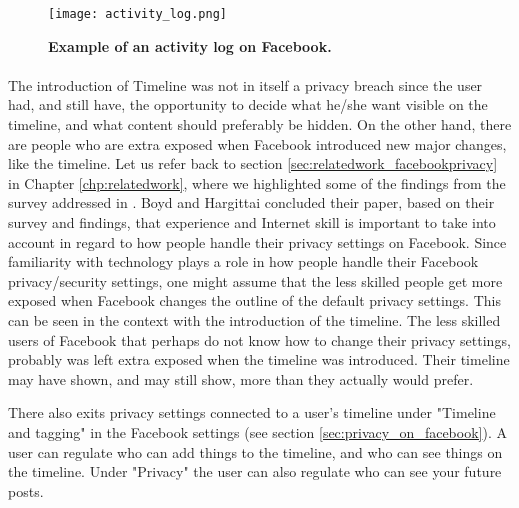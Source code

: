 \begin{figure}[t]
\centering
\texttt{[image: activity\_log.png]}
\caption [Example of an activity log on Facebook.]{\textbf{Example of an activity log on Facebook.}} 
\label{fig:activitylog}
\end{figure}

\paragraph{}
The introduction of Timeline was not in itself a privacy breach since the user had, and still have, the opportunity to decide what he/she want visible on the timeline, and what content should preferably be hidden. On the other hand, there are people who are extra exposed when Facebook introduced new major changes, like the timeline. Let us refer back to section \ref{sec:relatedwork_facebookprivacy} in Chapter \ref{chp:relatedwork}, where we highlighted some of the findings from the survey addressed in \cite{whocares}. Boyd and Hargittai concluded their paper, based on their survey and findings, that experience and Internet skill is important to take into account in regard to how people handle their privacy settings on Facebook. Since familiarity with technology plays a role in how people handle their Facebook privacy/security settings, one might assume that the less skilled people get more exposed when Facebook changes the outline of the default privacy settings. 
This can be seen in the context with the introduction of the timeline. The less skilled users of Facebook that perhaps do not know how to change their privacy settings, probably was left extra exposed when the timeline was introduced. Their timeline may have shown, and may still show, more than they actually would prefer. 

There also exits privacy settings connected to a user's timeline under "Timeline and tagging" in the Facebook settings (see section \ref{sec:privacy_on_facebook}). A user can regulate who can add things to the timeline, and who can see things on the timeline. Under "Privacy" the user can also regulate who can see your future posts. 

